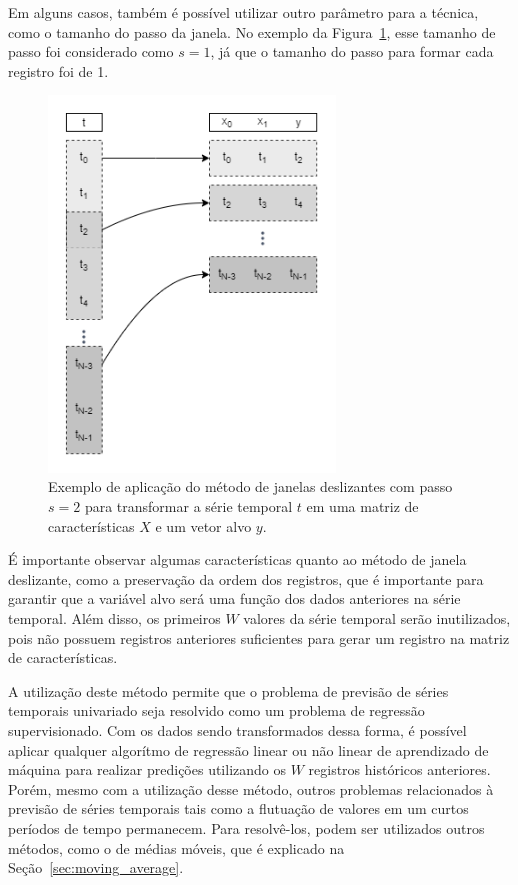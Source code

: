 Em alguns casos, também é possível utilizar outro parâmetro para a técnica, como o tamanho do passo da janela. No exemplo da Figura~\ref{fig:sliding_window_2}, esse tamanho de passo foi considerado como $s=1$, já que o tamanho do passo para formar cada registro foi de 1.

\begin{figure}[!htp] \label{fig:sliding_window_2}
    \centering
    \includegraphics[width=3.0in]{img/sliding_window_2.png}
    \caption{Exemplo de aplicação do método de janelas deslizantes com passo $s=2$  para transformar a série temporal $t$ em uma matriz de características $X$ e um vetor alvo $y$. }
\end{figure}

É importante observar algumas características quanto ao método de janela deslizante, como a preservação da ordem dos registros, que é importante para garantir que a variável alvo será uma função dos dados anteriores na série temporal. Além disso, os primeiros $W$ valores da série temporal serão inutilizados, pois não possuem registros anteriores suficientes para gerar um registro na matriz de características.

A utilização deste método permite que o problema de previsão de séries temporais univariado seja resolvido como um problema de regressão supervisionado. Com os dados sendo transformados dessa forma, é possível aplicar qualquer algorítmo de regressão linear ou não linear de aprendizado de máquina para realizar predições utilizando os $W$ registros históricos anteriores. Porém, mesmo com a utilização desse método, outros problemas relacionados à previsão de séries temporais tais como a flutuação de valores em um curtos períodos de tempo permanecem. Para resolvê-los, podem ser utilizados outros métodos, como o de médias móveis, que é explicado na Seção~\ref{sec:moving_average}.


